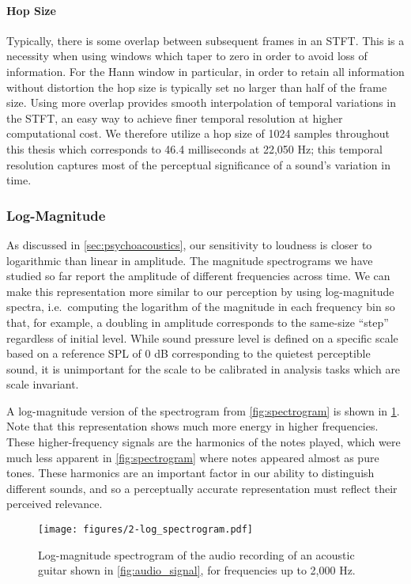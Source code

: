 \paragraph{Hop Size}

Typically, there is some overlap between subsequent frames in an STFT.
This is a necessity when using windows which taper to zero in order to avoid loss of information.
For the Hann window in particular, in order to retain all information without distortion the hop size is typically set no larger than half of the frame size.
Using more overlap provides smooth interpolation of temporal variations in the STFT, an easy way to achieve finer temporal resolution at higher computational cost.
We therefore utilize a hop size of 1024 samples throughout this thesis which corresponds to 46.4 milliseconds at 22,050 Hz; this temporal resolution captures most of the perceptual significance of a sound's variation in time.

\subsubsection{Log-Magnitude}

As discussed in \cref{sec:psychoacoustics}, our sensitivity to loudness is closer to logarithmic than linear in amplitude.
The magnitude spectrograms we have studied so far report the amplitude of different frequencies across time.
We can make this representation more similar to our perception by using log-magnitude spectra, i.e.\ computing the logarithm of the magnitude in each frequency bin so that, for example, a doubling in amplitude corresponds to the same-size “step” regardless of initial level.
While sound pressure level is defined on a specific scale based on a reference SPL of 0 dB corresponding to the quietest perceptible sound, it is unimportant for the scale to be calibrated in analysis tasks which are scale invariant.

A log-magnitude version of the spectrogram from \cref{fig:spectrogram} is shown in \cref{fig:log_spectrogram}.
Note that this representation shows much more energy in higher frequencies.
These higher-frequency signals are the harmonics of the notes played, which were much less apparent in \cref{fig:spectrogram} where notes appeared almost as pure tones.
These harmonics are an important factor in our ability to distinguish different sounds, and so a perceptually accurate representation must reflect their perceived relevance.

\begin{figure}
  \centering
  \texttt{[image: figures/2-log\_spectrogram.pdf]}
  \caption[Log-magnitude spectrogram of the acoustic guitar recording]{Log-magnitude spectrogram of the audio recording of an acoustic guitar shown in \cref{fig:audio_signal}, for frequencies up to 2,000 Hz.}
  \label{fig:log_spectrogram}
\end{figure}

